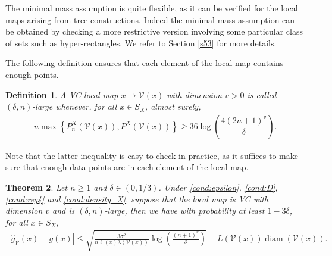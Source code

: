 \documentclass[paper=a4, fontsize=11pt]{scrartcl}
\newcommand{\diam}{\operatorname{diam}}
\newcommand{\PP}{\mathbb{P}}
\newtheorem{theorem}{Theorem}
\newtheorem{definition}[theorem]{Definition}
\begin{document}
The minimal mass assumption is quite flexible, as it can be verified for the local maps arising from tree constructions. Indeed the  minimal mass assumption can be obtained by checking a more restrictive version involving some particular class of sets such as hyper-rectangles. We refer to Section \ref{s53} for more details.  %

The following definition ensures that each element of the local map contains enough points. 

\begin{definition}
A VC local map  $x\mapsto  \mathcal V(x)$ with dimension $v>0$ is called $(\delta, n)$-large whenever, for all $x\in S_X$, almost surely,
    \begin{align*}
  n \max \left\{ P_n^X (\mathcal V(x))  ,     P^X(\mathcal V(x)) \right\}  \geq 36 \log\left(\dfrac{4 (2n+1) ^v }{\delta} \right).
\end{align*}
\end{definition}

Note that the latter inequality is easy to check in practice, as it suffices to make sure that enough data points are in each element of the local map.

\begin{theorem}
    \label{th2:general}
   Let $n\geq 1$ and $\delta \in (0,1/3) $.  Under \ref{cond:epsilon}, \ref{cond:D}, \ref{cond:reg4} and \ref{cond:density_X}, suppose that the local map is VC with dimension $v$ and is $(\delta, n)$-large, then we have with probability at least $1-3\delta$, for all $x\in S_X$,
\begin{align*}
        | \hat g_{\mathcal V}(x) - g(x)| \leq  \sqrt{\frac{ 3 \sigma^2}{  n  \ell(x) \lambda ( \mathcal V (x) )   }  \log\left( \frac{(n+1)^v}{\delta} \right)} + L(\mathcal V(x) ) \diam (\mathcal V(x) ).
    \end{align*}
\end{theorem}
\end{document}
